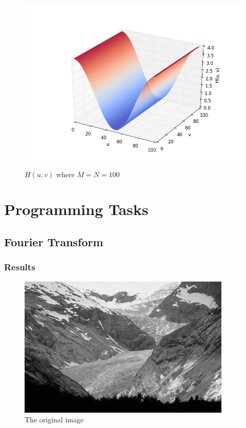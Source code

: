 \documentclass{article}
\begin{document}
\begin{figure}[H]
	\centering
	\includegraphics[width=420pt]{exercise-1-4.png}
	\caption{$H(u, v)$ where $M = N = 100$}
	\label{fig:Huv}
\end{figure}


\section{Programming Tasks}
\subsection{Fourier Transform}
\subsubsection{Results}
\begin{figure}[H]
	\centering
	\includegraphics[width=288pt]{../img/02.png}
	\caption{The original image}
\end{figure}
\end{document}

